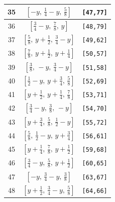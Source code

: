\documentclass[fleqn,8pt]{jsarticle}
\begin{document}
\begin{longtable}{ccc}
35 & $\left[ - y,\, \frac{1}{4} - y,\, \frac{5}{8} \right]$ & {\tt [47,77]} \\ \hline
36 & $\left[ \frac{3}{4} - y,\, \frac{7}{8},\, y \right]$ & {\tt [48,79]} \\ \hline
37 & $\left[ \frac{5}{8},\, y + \frac{1}{2},\, \frac{3}{4} - y \right]$ & {\tt [49,62]} \\ \hline
38 & $\left[ \frac{7}{8},\, y + \frac{1}{2},\, y + \frac{1}{4} \right]$ & {\tt [50,57]} \\ \hline
39 & $\left[ \frac{3}{8},\, - y,\, \frac{3}{4} - y \right]$ & {\tt [51,58]} \\ \hline
40 & $\left[ \frac{1}{2} - y,\, y + \frac{3}{4},\, \frac{5}{8} \right]$ & {\tt [52,69]} \\ \hline
41 & $\left[ y + \frac{1}{2},\, y + \frac{1}{4},\, \frac{7}{8} \right]$ & {\tt [53,71]} \\ \hline
42 & $\left[ \frac{3}{4} - y,\, \frac{3}{8},\, - y \right]$ & {\tt [54,70]} \\ \hline
43 & $\left[ y + \frac{3}{4},\, \frac{5}{8},\, \frac{1}{2} - y \right]$ & {\tt [55,72]} \\ \hline
44 & $\left[ \frac{5}{8},\, \frac{1}{2} - y,\, y + \frac{3}{4} \right]$ & {\tt [56,61]} \\ \hline
45 & $\left[ y + \frac{1}{4},\, \frac{7}{8},\, y + \frac{1}{2} \right]$ & {\tt [59,68]} \\ \hline
46 & $\left[ \frac{3}{4} - y,\, \frac{5}{8},\, y + \frac{1}{2} \right]$ & {\tt [60,65]} \\ \hline
47 & $\left[ - y,\, \frac{3}{4} - y,\, \frac{3}{8} \right]$ & {\tt [63,67]} \\ \hline
48 & $\left[ y + \frac{1}{2},\, \frac{3}{4} - y,\, \frac{5}{8} \right]$ & {\tt [64,66]} \\
\end{longtable}
\renewcommand{\arraystretch}{1.2}
\end{document}

